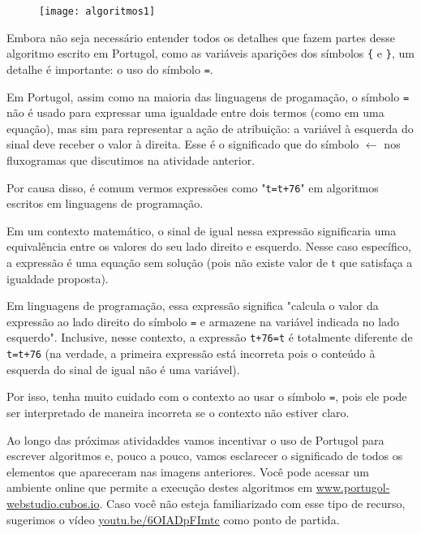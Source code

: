 \begin{figure}[H]
\centering

\texttt{[image: algoritmos1]}
\end{figure}

Embora não seja necessário entender todos os detalhes que fazem partes desse algoritmo escrito em Portugol, como as variáveis aparições dos símbolos \verb|{| e \verb|}|, um detalhe é importante: o uso do símbolo \verb|=|.

Em Portugol, assim como na maioria das linguagens de progamação, o símbolo \verb|=| não é usado para expressar uma igualdade entre dois termos (como em uma equação), mas sim para representar a ação de atribuição: a variável à esquerda do sinal deve receber o valor à direita. Esse é o significado que do símbolo $\leftarrow$ nos fluxogramas que discutimos na atividade anterior.

Por causa disso, é comum vermos expressões como "\verb|t=t+76|" em algoritmos escritos em linguagens de programação.

Em um contexto matemático, o sinal de igual nessa expressão significaria uma equivalência entre os valores do seu lado direito e esquerdo. Nesse caso específico, a expressão é uma equação sem solução (pois não existe valor de t que satisfaça a igualdade proposta).

Em linguagens de programação, essa expressão significa "calcula o valor da expressão ao lado direito do símbolo \verb|=| e armazene na variável indicada no lado esquerdo". Inclusive, nesse contexto, a expressão \verb|t+76=t| é totalmente diferente de \verb|t=t+76| (na verdade, a primeira expressão está incorreta pois o conteúdo à esquerda do sinal de igual não é uma variável).

\begin{observation}
Por isso, tenha muito cuidado com o contexto ao usar o símbolo \verb|=|, pois ele pode ser interpretado de maneira incorreta se o contexto não estiver claro.
\end{observation}

Ao longo das próximas atividaddes vamos incentivar o uso de Portugol para escrever algoritmos e, pouco a pouco, vamos esclarecer o significado de todos os elementos que apareceram nas imagens anteriores. Você pode acessar um ambiente online que permite a execução destes algoritmos em \url{www.portugol-webstudio.cubos.io}. Caso você não esteja familiarizado com esse tipo de recurso, sugerimos o vídeo \url{youtu.be/6OIADpFImtc} como ponto de partida.


